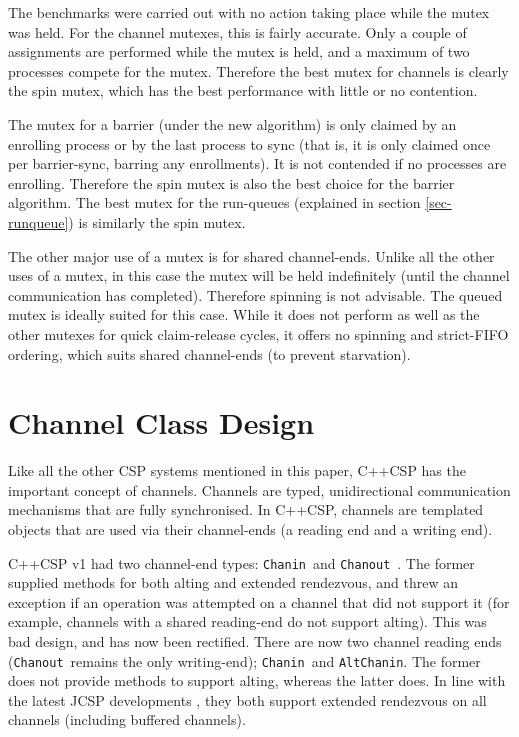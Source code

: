 \documentclass[12pt]{IOS-Book-Article-CPA-2007}
\newcommand{\code}[1]{{\small\texttt{#1}}}
\begin{document}
The benchmarks were carried out with no action taking place while the mutex was held.  For the channel mutexes, this is fairly accurate.  Only a couple 
of assignments are performed while the mutex is held, and a maximum of two processes compete for the mutex.  Therefore the best mutex for channels is 
clearly the spin mutex, which has the best performance with little or no contention.

The mutex for a barrier (under the new algorithm) is only claimed by an enrolling process or by the last process to sync (that is, it is only claimed once per barrier-sync, barring
any enrollments).  It is not contended if no processes are enrolling.  Therefore the spin mutex is also the best choice for the barrier algorithm.
The best mutex for the run-queues (explained in section \ref{sec-runqueue}) is similarly the spin mutex.

The other major use of a mutex is for shared channel-ends.  Unlike all the other uses of a mutex, in this case the mutex will be held indefinitely (until
the channel communication has completed).  Therefore spinning is not advisable.  The queued mutex is ideally suited for this case.  While it does not perform
as well as the other mutexes for quick claim-release cycles, it offers no spinning and strict-FIFO ordering, which suits shared channel-ends (to prevent
starvation).

\section{Channel Class Design}

\label{sec-channel}

Like all the other CSP systems mentioned in this paper, C++CSP has the important concept of channels.  Channels are typed, unidirectional 
communication mechanisms that are fully synchronised.  In C++CSP, channels are templated objects that are used via their channel-ends (a reading end 
and a writing end).

C++CSP v1 had two channel-end types: \code{Chanin}~and \code{Chanout}~\cite{brown-c++csp-03}.  The former supplied methods for both alting and 
extended rendezvous, and threw an exception if an operation was attempted on a channel that did not support it (for example, channels with a shared 
reading-end do not support alting).  This was bad design, and has now been rectified.  There are now two 
channel reading ends (\code{Chanout}~remains the only writing-end); \code{Chanin}~and \code{AltChanin}.  The former does not provide methods to 
support alting, whereas the latter does.  In line with the latest JCSP developments \cite{welch-jcsp-2007}, they both support extended rendezvous 
on all channels (including buffered channels).
\end{document}
